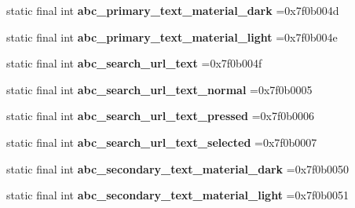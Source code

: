 \begin{DoxyCompactItemize}
\item 
\mbox{\label{classproject4_1_1xaria_1_1R_1_1color_ab10110df77af95fc56626c1c3f3a95e7}} 
static final int {\bfseries abc\+\_\+primary\+\_\+text\+\_\+material\+\_\+dark} =0x7f0b004d
\item 
\mbox{\label{classproject4_1_1xaria_1_1R_1_1color_a7ec17e9d11c46be15b5321f5b617c749}} 
static final int {\bfseries abc\+\_\+primary\+\_\+text\+\_\+material\+\_\+light} =0x7f0b004e
\item 
\mbox{\label{classproject4_1_1xaria_1_1R_1_1color_ad675ee56a26872b5d7ebba9d3ee8a762}} 
static final int {\bfseries abc\+\_\+search\+\_\+url\+\_\+text} =0x7f0b004f
\item 
\mbox{\label{classproject4_1_1xaria_1_1R_1_1color_ac7041e375b630494518fcbf476fc7e3e}} 
static final int {\bfseries abc\+\_\+search\+\_\+url\+\_\+text\+\_\+normal} =0x7f0b0005
\item 
\mbox{\label{classproject4_1_1xaria_1_1R_1_1color_a629d3fc7b8b727796e9e3a72cd3953bb}} 
static final int {\bfseries abc\+\_\+search\+\_\+url\+\_\+text\+\_\+pressed} =0x7f0b0006
\item 
\mbox{\label{classproject4_1_1xaria_1_1R_1_1color_a580247ba4c8a6363fcbf5ffcb72b73d8}} 
static final int {\bfseries abc\+\_\+search\+\_\+url\+\_\+text\+\_\+selected} =0x7f0b0007
\item 
\mbox{\label{classproject4_1_1xaria_1_1R_1_1color_a8165fae75fb9a3f0e759af006b55bb18}} 
static final int {\bfseries abc\+\_\+secondary\+\_\+text\+\_\+material\+\_\+dark} =0x7f0b0050
\item 
\mbox{\label{classproject4_1_1xaria_1_1R_1_1color_adef676cfbe1c43949477cec245cf8629}} 
static final int {\bfseries abc\+\_\+secondary\+\_\+text\+\_\+material\+\_\+light} =0x7f0b0051
\item 
\mbox{\label{classproject4_1_1xaria_1_1R_1_1color_a8514e3e82ddbb08c0f0603bbc07dd0aa}} 

\end{DoxyCompactItemize}
